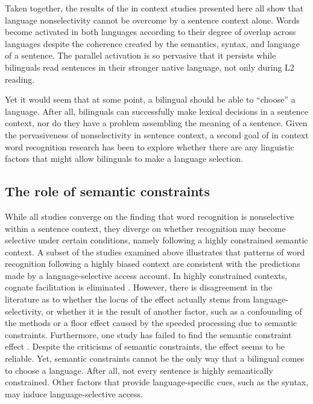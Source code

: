 Taken together, the results of the in context studies presented here all show that language nonselectivity cannot be overcome by a sentence context alone. Words become activated in both languages according to their degree of overlap across languages despite the coherence created by the semantics, syntax, and language of a sentence. The parallel activation is so pervasive that it persists while bilinguals read sentences in their stronger native language, not only during L2 reading.  

Yet it would seem that at some point, a bilingual should be able to ``choose'' a language. After all, bilinguals can successfully make lexical decisions in a sentence context, nor do they have a problem assembling the meaning of a sentence. Given the pervasiveness of nonselectivity in sentence context, a second goal of in context word recognition research has been to explore whether there are any linguistic factors that might allow bilinguals to make a language selection.

\subsection{The role of semantic constraints}\label{Intro::InContext::SemanticConstraints}
While all studies converge on the finding that word recognition is nonselective within a sentence context, they diverge on whether recognition may become selective under certain conditions, namely following a highly constrained semantic context. A subset of the studies examined above illustrates that patterns of word recognition following a highly biased context are consistent with the predictions made by a language-selective access account. In highly constrained  contexts, cognate facilitation is eliminated \parencite[the \textit{semantic constraint effect}; e.g.,][]{Chambers2009,Libben2009, Schwartz2006, VanHell2008}. However, there is disagreement in the literature as to whether the locus of the effect actually stems from language-selectivity, or whether it is the result of another factor, such as a confounding of the methods or a floor effect caused by the speeded processing due to semantic constraints. Furthermore, one study has failed to find the semantic constraint effect \parencite[e.g.,][]{VanAssche2010}. Despite the criticisms of semantic constraints, the effect seems to be reliable. Yet, semantic constraints cannot be the only way that a bilingual comes to choose a language. After all, not every sentence is highly semantically constrained. Other factors that provide language-specific cues, such as the syntax, may induce language-selective access.   


